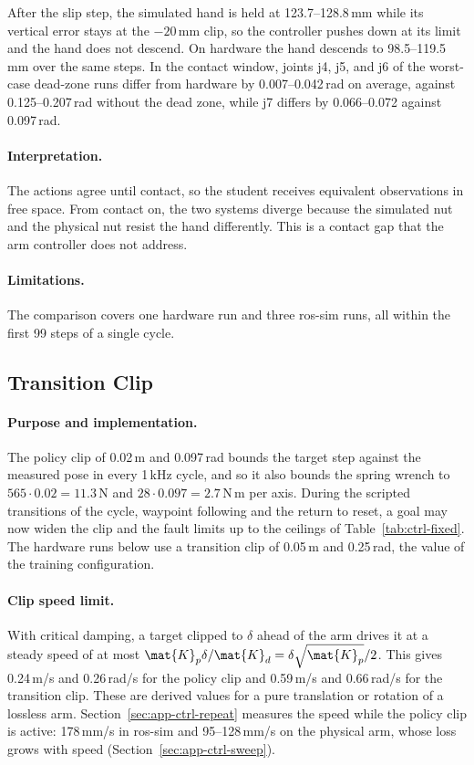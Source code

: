 After the slip step, the simulated hand is held at 123.7--128.8\,mm while its vertical error stays at the $-20$\,mm clip, so the controller pushes down at its limit and the hand does not descend. On hardware the hand descends to 98.5--119.5\,mm over the same steps. In the contact window, joints j4, j5, and j6 of the worst-case dead-zone runs differ from hardware by 0.007--0.042\,rad on average, against 0.125--0.207\,rad without the dead zone, while j7 differs by 0.066--0.072 against 0.097\,rad.

\paragraph{Interpretation.} The actions agree until contact, so the student receives equivalent observations in free space. From contact on, the two systems diverge because the simulated nut and the physical nut resist the hand differently. This is a contact gap that the arm controller does not address.

\paragraph{Limitations.} The comparison covers one hardware run and three ros-sim runs, all within the first 99 steps of a single cycle.

\subsection{Transition Clip}\label{sec:app-ctrl-tclip}

\paragraph{Purpose and implementation.} The policy clip of 0.02\,m and 0.097\,rad bounds the target step against the measured pose in every 1\,kHz cycle, and so it also bounds the spring wrench to $565\cdot0.02=11.3$\,N and $28\cdot0.097=2.7$\,N\,m per axis. During the scripted transitions of the cycle, waypoint following and the return to reset, a goal may now widen the clip and the fault limits up to the ceilings of Table~\ref{tab:ctrl-fixed}. The hardware runs below use a transition clip of 0.05\,m and 0.25\,rad, the value of the training configuration.

\paragraph{Clip speed limit.} With critical damping, a target clipped to $\delta$ ahead of the arm drives it at a steady speed of at most $\mat{K}_p\delta/\mat{K}_d=\delta\sqrt{\mat{K}_p}/2$. This gives 0.24\,m/s and 0.26\,rad/s for the policy clip and 0.59\,m/s and 0.66\,rad/s for the transition clip. These are derived values for a pure translation or rotation of a lossless arm. Section~\ref{sec:app-ctrl-repeat} measures the speed while the policy clip is active: 178\,mm/s in ros-sim and 95--128\,mm/s on the physical arm, whose loss grows with speed (Section~\ref{sec:app-ctrl-sweep}).

